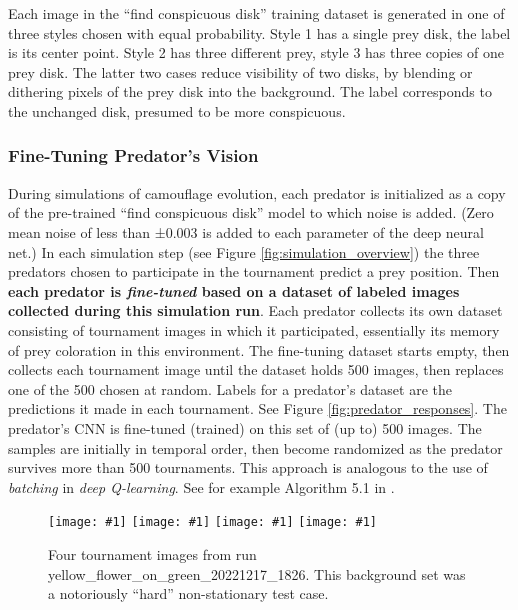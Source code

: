 \documentclass[letterpaper]{article}
\newcommand{\jargon}[1]{\textit{#1}}
\newcommand{\runID}{\footnotesize}
\newcommand{\igfour}[1]{\texttt{[image: \#1]}}
\begin{document}
Each image in the ``find conspicuous disk'' training dataset is generated in one of three styles chosen with equal probability. Style 1 has a single prey disk, the label is its center point. Style 2 has three different prey, style 3 has three copies of one prey disk. The latter two cases reduce visibility of two disks, by blending or dithering pixels of the prey disk into the background. The label corresponds to the unchanged disk, presumed to be more conspicuous.
\par

\subsubsection{Fine-Tuning Predator's Vision}
During simulations of camouflage evolution, each predator is initialized as a copy of the pre-trained ``find conspicuous disk'' model to which noise is added. (Zero mean noise of less than ±0.003 is added to each parameter of the deep neural net.) In each simulation step (see Figure \ref{fig:simulation_overview}) the three predators chosen to participate in the tournament predict a prey position. Then \textbf{each predator is \jargon{fine-tuned} based on a dataset of labeled images collected during this simulation run}. 
Each predator collects its own dataset consisting of tournament images in which it participated, essentially its memory of prey coloration in this environment. The fine-tuning dataset starts empty, then collects each tournament image until the dataset holds 500 images, then replaces one of the 500 chosen at random. Labels for a predator's dataset are the predictions it made in each tournament. See Figure \ref{fig:predator_responses}. The predator's CNN is fine-tuned (trained) on this set of (up to) 500 images. The samples are initially in temporal order, then become randomized as the predator survives more than 500 tournaments. This approach is analogous to the use of \jargon{batching} in \jargon{deep Q-learning}. See for example Algorithm 5.1 in \citet{casgrain_deep_2022}.
\par


\begin{figure}[t]
    \igfour{20221218_step_5396.png}
    \hfill
    \igfour{20221218_step_5641.png}
    \hfill
    \igfour{20221218_step_5947.png}
    \hfill
    \igfour{20221218_step_6753.png}
    \caption{Four tournament images from run {\runID yellow\_flower\_on\_green\_20221217\_1826}. This background set was a notoriously ``hard'' non-stationary test case.}
    \label{fig:yellow_flower_4x}
\end{figure}
\end{document}
